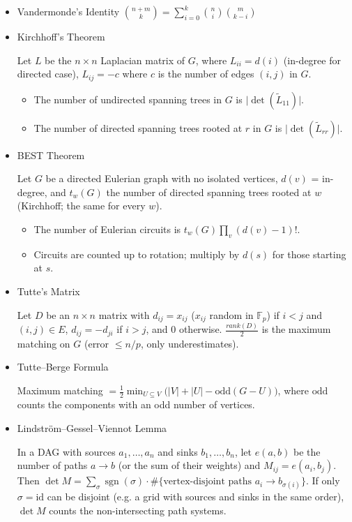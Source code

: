 \begin{itemize}
\item Vandermonde's Identity $\binom{n+m}{k} = \sum_{i=0}^{k} \binom{n}{i}\binom{m}{k-i}$

\item Kirchhoff's Theorem

Let $L$ be the $n \times n$ Laplacian matrix of $G$, where $L_{ii} = d(i)$ (in-degree for directed case), $L_{ij} = -c$ where $c$ is the number of edges $(i, j)$ in $G$.
\begin{itemize}
  \item The number of undirected spanning trees in $G$ is $\lvert \det(\tilde{L}_{11}) \rvert$.
  \item The number of directed spanning trees rooted at $r$ in $G$ is $\lvert \det(\tilde{L}_{rr}) \rvert$.
\end{itemize}

\item BEST Theorem

Let $G$ be a directed Eulerian graph with no isolated vertices, $d(v)$ = in-degree, and $t_w(G)$ the number of directed spanning trees rooted at $w$ (Kirchhoff; the same for every $w$).
\begin{itemize}
  \item The number of Eulerian circuits is $t_w(G) \prod_v (d(v) - 1)!$.
  \item Circuits are counted up to rotation; multiply by $d(s)$ for those starting at $s$.
\end{itemize}

\item Tutte's Matrix

Let $D$ be an $n \times n$ matrix with $d_{ij} = x_{ij}$ ($x_{ij}$ random in $\mathbb{F}_p$) if $i < j$ and $(i, j) \in E$, $d_{ij} = -d_{ji}$ if $i > j$, and $0$ otherwise. $\frac{rank(D)}{2}$ is the maximum matching on $G$ (error $\le n/p$, only underestimates).

\item Tutte–Berge Formula

Maximum matching $= \frac 1 2 \min_{U \subseteq V} \big(|V| + |U| - \mathrm{odd}(G - U)\big)$, where $\mathrm{odd}$ counts the components with an odd number of vertices.

\item Lindström–Gessel–Viennot Lemma

In a DAG with sources $a_1, \ldots, a_n$ and sinks $b_1, \ldots, b_n$, let $e(a, b)$ be the number of paths $a \to b$ (or the sum of their weights) and $M_{ij} = e(a_i, b_j)$. Then $\det M = \sum_{\sigma} \operatorname{sgn}(\sigma) \cdot \#\{\text{vertex-disjoint paths } a_i \to b_{\sigma(i)}\}$. If only $\sigma = \mathrm{id}$ can be disjoint (e.g. a grid with sources and sinks in the same order), $\det M$ counts the non-intersecting path systems.


\end{itemize}
